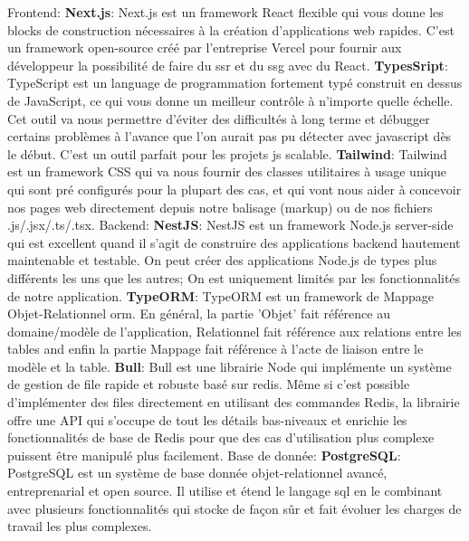 \documentclass[../main.tex]{subfiles}
\begin{document}
    \begin{outline}
 \1 Frontend:
   \2 \textbf{Next.js}: Next.js est un framework React flexible qui vous donne les blocks de construction nécessaires à la création d'applications web rapides.\cite{nextjsvercel}
   C'est un framework open-source créé par l'entreprise Vercel pour fournir aux développeur la possibilité de faire du \acrlong{ssr} et du \acrlong{ssg} avec du React.\cite{nextjswikipedia}
   \2 \textbf{TypesSript}: TypeScript est un language de programmation fortement typé construit en dessus de JavaScript, ce qui vous donne un meilleur contrôle à n'importe quelle échelle.\cite{typescript} Cet outil va nous permettre d'éviter des difficultés à long terme et débugger certains problèmes à l'avance que l'on aurait pas pu détecter avec javascript dès le début. C'est un outil parfait pour les projets \acrshort{js} scalable.
   \2 \textbf{Tailwind}: Tailwind est un framework CSS qui va nous fournir des classes utilitaires à usage unique qui sont pré configurés pour la plupart des cas, et qui vont nous aider à concevoir nos pages web directement depuis notre balisage (markup) ou de nos fichiers .js/.jsx/.ts/.tsx.\cite{tailwind}
 \1 Backend:
   \2 \textbf{NestJS}: NestJS est un framework Node.js server-side qui est excellent quand il s'agit de construire des applications backend hautement maintenable et testable. On peut créer des applications Node.js de types plus différents les uns que les autres; On est uniquement limités par les fonctionnalités de notre application.\cite{nestjs} 
   \2 \textbf{TypeORM}: TypeORM est un framework de Mappage Objet-Relationnel \acrshort{orm}. En général, la partie 'Objet' fait référence au domaine/modèle de l'application, Relationnel fait référence aux relations entre les tables and enfin la partie Mappage fait référence à l'acte de liaison entre le modèle et la table.\cite{typeorm}
   \2 \textbf{Bull}: Bull est une librairie Node qui implémente un système de gestion de file rapide et robuste basé sur redis.
   Même si c'est possible d'implémenter des files directement en utilisant des commandes Redis, la librairie offre une API qui s'occupe de tout les détails bas-niveaux et enrichie les fonctionnalités de base de Redis pour que des cas d'utilisation plus complexe puissent être manipulé plus facilement.\cite{bull}
 \1 Base de donnée:
    \2 \textbf{PostgreSQL}: PostgreSQL est un système de base donnée objet-relationnel  avancé, entreprenarial et open source. Il utilise et étend le langage \acrshort{sql} en le combinant avec plusieurs fonctionnalités qui stocke de façon sûr et fait évoluer les charges de travail les plus complexes.\cite{postgre}

\end{outline}
\end{document}

